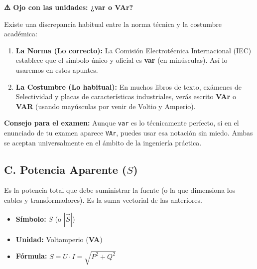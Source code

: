 \documentclass[
  a4paper,
  DIV=11,
  numbers=noendperiod]{scrreprt}
\providecommand{\tightlist}{%
  \setlength{\itemsep}{0pt}\setlength{\parskip}{0pt}}
\begin{document}
\begin{tcolorbox}[enhanced jigsaw, breakable, colback=white, left=2mm, leftrule=.75mm, rightrule=.15mm, toprule=.15mm, colframe=quarto-callout-warning-color-frame, arc=.35mm, bottomrule=.15mm, opacityback=0]

\vspace{-3mm}\textbf{⚠️ Ojo con las unidades: ¿var o VAr?}\vspace{3mm}

Existe una discrepancia habitual entre la norma técnica y la costumbre
académica:

\begin{enumerate}
\def\labelenumi{\arabic{enumi}.}
\tightlist
\item
  \textbf{La Norma (Lo correcto):} La Comisión Electrotécnica
  Internacional (IEC) establece que el símbolo único y oficial es
  \textbf{var} (en minúsculas). Así lo usaremos en estos apuntes.
\item
  \textbf{La Costumbre (Lo habitual):} En muchos libros de texto,
  exámenes de Selectividad y placas de características industriales,
  verás escrito \textbf{VAr} o \textbf{VAR} (usando mayúsculas por venir
  de Voltio y Amperio).
\end{enumerate}

\textbf{Consejo para el examen:} Aunque \texttt{var} es lo técnicamente
perfecto, si en el enunciado de tu examen aparece \texttt{VAr}, puedes
usar esa notación sin miedo. Ambas se aceptan universalmente en el
ámbito de la ingeniería práctica.

\end{tcolorbox}

\subsection*{\texorpdfstring{C. Potencia Aparente
(\(S\))}{C. Potencia Aparente (S)}}\label{c.-potencia-aparente-s}

Es la potencia total que debe suministrar la fuente (o la que dimensiona
los cables y transformadores). Es la suma vectorial de las anteriores.

\vspace{-1em}

\begin{itemize}
\tightlist
\item
  \textbf{Símbolo:} \(S\) (o \(|\vec{S}|\))
\item
  \textbf{Unidad:} Voltamperio (\textbf{VA})
\item
  \textbf{Fórmula:} \(S = U \cdot I = \sqrt{P^2 + Q^2}\)
\end{itemize}
\end{document}
